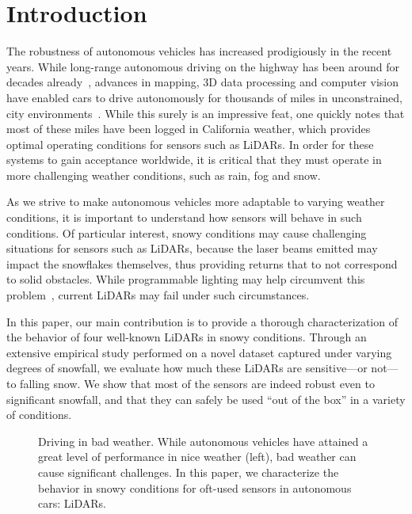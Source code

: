 \section{Introduction}

The robustness of autonomous vehicles has increased prodigiously in the recent years. While long-range autonomous driving on the highway has been around for decades already~\cite{Pomerleau_1996_616}, advances in mapping, 3D data processing and computer vision have enabled cars to drive autonomously for thousands of miles in unconstrained, city environments~. While this surely is an impressive feat, one quickly notes that most of these miles have been logged in California weather, which provides optimal operating conditions for sensors such as LiDARs. In order for these systems to gain acceptance worldwide, it is critical that they must operate in more challenging weather conditions, such as rain, fog and snow. 

As we strive to make autonomous vehicles more adaptable to varying weather conditions, it is important to understand how sensors will behave in such conditions. Of particular interest, snowy conditions may cause challenging situations for sensors such as LiDARs, because the laser beams emitted may impact the snowflakes themselves, thus providing returns that to not correspond to solid obstacles. While programmable lighting may help circumvent this problem~, current LiDARs may fail under such circumstances. 

In this paper, our main contribution is to provide a thorough characterization of the behavior of four well-known LiDARs in snowy conditions. Through an extensive empirical study performed on a novel dataset captured under varying degrees of snowfall, we evaluate how much these LiDARs are sensitive---or not---to falling snow. We show that most of the sensors are indeed robust even to significant snowfall, and that they can safely be used ``out of the box'' in a variety of conditions. 


\begin{figure}
\caption{Driving in bad weather. While autonomous vehicles have attained a great level of performance in nice weather (left), bad weather can cause significant challenges. In this paper, we characterize the behavior in snowy conditions for oft-used sensors in autonomous cars: LiDARs.}
\label{fig:good-bad-weather}
\end{figure}


